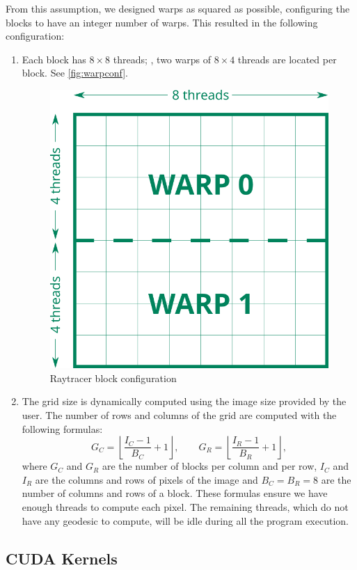 From this assumption, we designed warps as squared as possible, configuring the blocks to have an integer number of warps. This resulted in the following configuration:
\begin{enumerate}
	\item Each block has $8\times8$ threads; \ie, two warps of $8\times4$ threads are located per block. See \autoref{fig:warpconf}.
	\begin{figure}[bth]
		\myfloatalign
		\includegraphics[width=.5\linewidth]{gfx/warpconf.png}
		\caption[Raytracer block configuration]{Raytracer block configuration}
		\label{fig:warpconf}
	\end{figure}
	\item The grid size is dynamically computed using the image size provided by the user. The number of rows and columns of the grid are computed with the following formulas:
	\begin{equation*}
		G_C = \left \lfloor{\frac{I_C - 1}{B_C} + 1}\right \rfloor, \qquad
		G_R = \left \lfloor{\frac{I_R - 1}{B_R} + 1}\right \rfloor,
	\end{equation*}
	where $G_C$ and $G_R$ are the number of blocks per column and per row, $I_C$ and $I_R$ are the columns and rows of pixels of the image and $B_C = B_R = 8$ are the number of columns and rows of a block. These formulas ensure we have enough threads to compute each pixel. The remaining threads, which do not have any geodesic to compute, will be idle during all the program execution.
\end{enumerate}

\subsection{CUDA Kernels}

